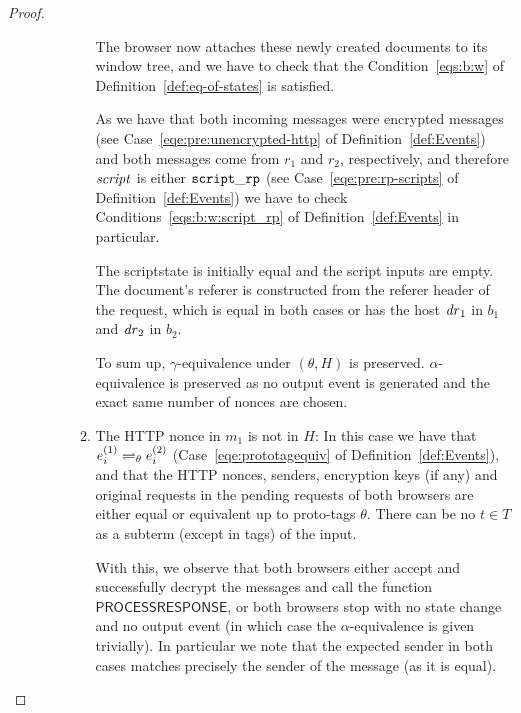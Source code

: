 \begin{proof}
\begin{description}
\begin{enumerate}[I.]
\begin{enumerate}
              The browser now attaches these newly created documents to its
              window tree, and we have to check that the
              Condition~\ref{eqs:b:w} of Definition~\ref{def:eq-of-states}
              is satisfied.
      
              As we have that both incoming messages were encrypted messages
              (see Case~\ref{eqe:pre:unencrypted-http} of
              Definition~\ref{def:Events}) and both messages come from
              $r_1$ and $r_2$, respectively, and therefore $\mathit{script}$ is
              either $\mathtt{script\_rp}$ (see
              Case~\ref{eqe:pre:rp-scripts} of
              Definition~\ref{def:Events}) we have to check
              Conditions~\ref{eqs:b:w:script_rp} of
              Definition~\ref{def:Events} in particular.
      
              The scriptstate is initially equal and the script inputs are empty. The document's
              referer is constructed from the referer header of the request,
              which is equal in both cases or has the host $\mathit{dr}_1$ in
              $b_1$ and $\mathit{dr}_2$ in $b_2$.
      
              To sum up, $\gamma$-equivalence under $(\theta, H)$ is
              preserved. $\alpha$-equivalence is preserved as no output
              event is generated and the exact same number of nonces are
              chosen.
      
            
            \item The HTTP nonce in $m_1$ is not in $H$: In this case we
              have that $e_i^{(1)} \rightleftharpoons_{\theta} e_i^{(2)}$
              (Case~\ref{eqe:prototagequiv} of
              Definition~\ref{def:Events}), and that the HTTP nonces,
              senders, encryption keys (if any) and original requests in the
              pending requests of both browsers are either equal or
              equivalent up to proto-tags $\theta$. There can be no
              $t \in T$ as a subterm (except in tags) of the input.
      
              With this, we observe that both browsers either accept and
              successfully decrypt the messages and call the function
              $\mathsf{PROCESSRESPONSE}$, or both browsers stop with no
              state change and no output event (in which case the
              $\alpha$-equivalence is given trivially). In particular we
              note that the expected sender in both cases matches precisely
              the sender of the message (as it is equal).
      

\end{enumerate}
\end{enumerate}
\end{description}
\end{proof}
